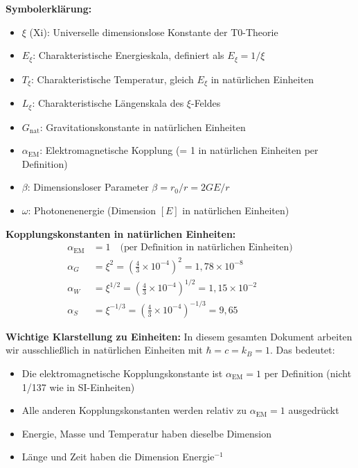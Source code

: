 	\textbf{Symbolerklärung:}
	\begin{itemize}
		\item $\xi$ (Xi): Universelle dimensionslose Konstante der T0-Theorie
		\item $E_\xi$: Charakteristische Energieskala, definiert als $E_\xi = 1/\xi$
		\item $T_\xi$: Charakteristische Temperatur, gleich $E_\xi$ in natürlichen Einheiten
		\item $L_\xi$: Charakteristische Längenskala des $\xi$-Feldes
		\item $G_{\text{nat}}$: Gravitationskonstante in natürlichen Einheiten
		\item $\alpha_{\text{EM}}$: Elektromagnetische Kopplung (= 1 in natürlichen Einheiten per Definition)
		\item $\beta$: Dimensionsloser Parameter $\beta = r_0/r = 2GE/r$
		\item $\omega$: Photonenenergie (Dimension $[E]$ in natürlichen Einheiten)
	\end{itemize}
	
	\textbf{Kopplungskonstanten in natürlichen Einheiten:}
	\begin{align}
		\alpha_{\text{EM}} &= 1 \quad \text{(per Definition in natürlichen Einheiten)} \\
		\alpha_G &= \xi^2 = \left(\frac{4}{3} \times 10^{-4}\right)^2 = 1{,}78 \times 10^{-8} \\
		\alpha_W &= \xi^{1/2} = \left(\frac{4}{3} \times 10^{-4}\right)^{1/2} = 1{,}15 \times 10^{-2} \\
		\alpha_S &= \xi^{-1/3} = \left(\frac{4}{3} \times 10^{-4}\right)^{-1/3} = 9{,}65
	\end{align}
	
	\textbf{Wichtige Klarstellung zu Einheiten:}
	In diesem gesamten Dokument arbeiten wir ausschließ{}lich in natürlichen Einheiten mit $\hbar = c = k_B = 1$. Das bedeutet:
	\begin{itemize}
		\item Die elektromagnetische Kopplungskonstante ist $\alpha_{\text{EM}} = 1$ per Definition (nicht 1/137 wie in SI-Einheiten)
		\item Alle anderen Kopplungskonstanten werden relativ zu $\alpha_{\text{EM}} = 1$ ausgedrückt
		\item Energie, Masse und Temperatur haben dieselbe Dimension
		\item Länge und Zeit haben die Dimension Energie$^{-1}$
	\end{itemize}
	

